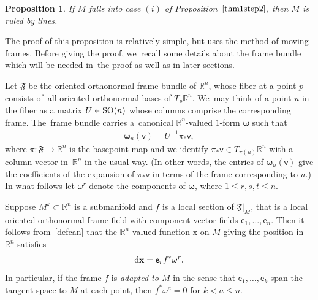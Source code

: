 \documentclass[10pt,a4paper]{amsart}
\def\R{\mathbb{R}}
\def\ve{\mathsf{e}}
\def\vv{\mathsf{v}}
\def\vx{\boldsymbol{\mathrm{x}}}
\def\vomega{\boldsymbol{\omega}}
\def\F{\mathfrak{F}}
\def\w{\omega}
\newtheorem{Proposition}[Theorem]{Proposition}
\numberwithin{equation}{section}
\begin{document}
\begin{Proposition} \label{ruledprop}
If $M$ falls into case $(i)$ of Proposition~$\ref{thm1step2}$, then $M$ is ruled by lines.
\end{Proposition}
The proof of this proposition is relatively simple, but uses the method of moving frames. Before giving the proof, we~recall some details about the frame bundle which will be needed in~the proof as well as in later sections.

Let $\F$ be the oriented orthonormal frame bundle of $\R^n$, whose fiber at a point $p$ consists of~all oriented orthonormal bases of $T_p \R^n$. We~may think of a point $u$ in the fiber as a matrix $U \in {\rm SO}(n)$ whose columns comprise the corresponding frame. The~frame bundle carries a~canonical $\R^n$-valued $1$-form $\vomega$ such that
\begin{gather} \label{defcan}
\vomega_u(\vv) = U^{-1} \pi_* \vv,
\end{gather}
where $\pi\colon\F \to \R^n$ is the basepoint map and we identify $\pi_*\vv \in T_{\pi(u)} \R^n$ with a column vector in~$\R^n$ in the usual way. (In other words, the entries of $\vomega_u(\vv)$ give the coefficients of the expansion of $\pi_* \vv$ in terms of the frame corresponding to $u$.) In what follows let $\w^r$ denote the components of $\vomega$, where $1 \le r,s,t \le n$.

Suppose $M^k \subset \R^n$ is a submanifold and $f$ is a local section of $\F\vert_M$, that is a local oriented orthonormal frame field with component vector fields $\ve_1, \dots, \ve_n$. Then it follows from~\eqref{defcan} that the $\R^n$-valued function $\vx$ on $M$ giving the position in $\R^n$ satisfies
\begin{gather} \label{deex}
{\rm d}\vx = \ve_r f^* \w^r.
\end{gather}
In particular, if the frame $f$ is \emph{adapted to $M$} in the sense that $\ve_1, \dots, \ve_k$ span the tangent space to $M$ at each point, then $f^* \w^a=0$ for $k < a\le n$.
\end{document}

